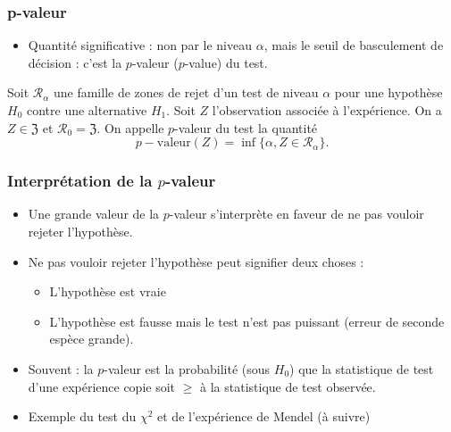 \begin{frame}
\frametitle{p-valeur}
\begin{itemize}
\item Quantité \alert{significative} : non par le niveau $\alpha$, mais le \alert{seuil de basculement de décision} : c'est la $p$-valeur ($p$-value) du test.
\end{itemize}
\begin{df}
Soit ${\mathcal R}_\alpha$ une famille de zones de rejet d'un test de niveau $\alpha$ pour une hypothèse $H_0$ contre une alternative $H_1$. Soit $Z$ l'observation associée à l'expérience. On a $Z \in \mathfrak{Z}$ et ${\mathcal R}_0 = \mathfrak{Z}$.
On appelle \alert{$p$-valeur du test} la quantité
$$p-\text{valeur}(Z) = \inf\{\alpha, Z \in {\mathcal R}_\alpha\}.$$
\end{df}
\end{frame}

\begin{frame}
\frametitle{Interprétation de la $p$-valeur}
\begin{itemize}
\item Une grande valeur de la $p$-valeur s'interprète en faveur de \alert{ne pas vouloir rejeter l'hypothèse}.
\item  Ne pas vouloir rejeter l'hypothèse  peut signifier deux choses :
\begin{itemize}
\item L'hypothèse est vraie
\item L'hypothèse est fausse \alert{ mais} le test n'est pas \alert{puissant} (erreur de seconde espèce \alert{grande}).
\end{itemize}
\item \alert{Souvent :} la $p$-valeur est la probabilité (sous $H_0$) que la statistique de test d'une expérience  copie  soit $\geq$ à la statistique de test observée.
\item \alert{Exemple du test du $\chi^2$ et de l'expérience de Mendel} (à suivre) %
\end{itemize}
\end{frame}





